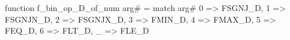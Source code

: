 function f_bin_op_D_of_num arg# = match arg# {
  0 => FSGNJ_D,
  1 => FSGNJN_D,
  2 => FSGNJX_D,
  3 => FMIN_D,
  4 => FMAX_D,
  5 => FEQ_D,
  6 => FLT_D,
  _ => FLE_D
}
